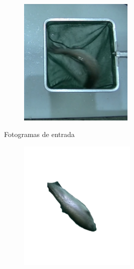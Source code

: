 \begin{enumerate}
\begin{figure}[H]
\begin{subfigure}[b]{\textwidth}
\begin{subfigure}[b]{0.25\textwidth}
                    \label{fig:SinOptical3}
                \end{subfigure}
                \begin{subfigure}[b]{0.25\textwidth}
                    \centering
                    \includegraphics[width=0.78\textwidth]{images/6/SinOptical4.png}
                    \label{fig:SinOptical4}
                \end{subfigure}
                \caption{Fotogramas de entrada}
                \label{fig:FotogramasEntrada}
            \end{subfigure}
            \begin{subfigure}[b]{\textwidth}
                \centering
                \begin{subfigure}[b]{0.25\textwidth}
                    \centering
                    \includegraphics[width=0.8\textwidth]{images/6/Vacio2.png}

\end{subfigure}
\end{subfigure}
\end{figure}
\end{enumerate}
